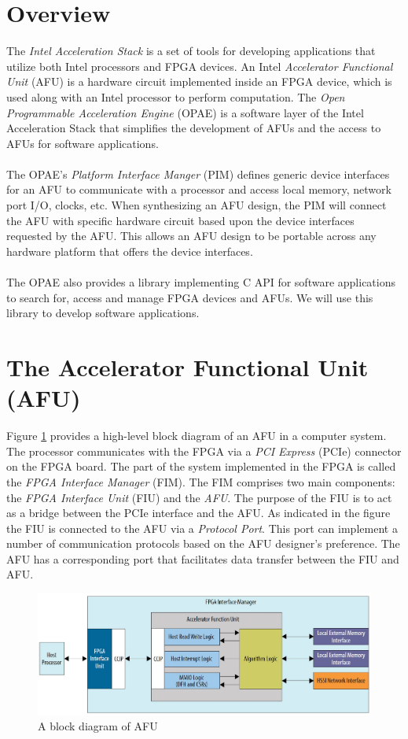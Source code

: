 \documentclass[11pt, twoside, pdftex]{article}
\begin{document}
\section{Overview}
The {\it Intel Acceleration Stack} is a set of tools for developing applications that utilize both Intel processors and FPGA devices. An Intel {\it Accelerator Functional Unit} (AFU) is a hardware circuit implemented inside an FPGA device, which is used along with an Intel processor to perform computation. The {\it Open Programmable Acceleration Engine} (OPAE) is a software layer of the Intel Acceleration Stack that simplifies the development of AFUs and the access to AFUs for software applications. \\
\\
The OPAE's {\it Platform Interface Manger} (PIM) defines generic device interfaces for an AFU to communicate with a processor and access local memory, network port I/O, clocks, etc. When synthesizing an AFU design, the PIM will connect the AFU with specific hardware circuit based upon the device interfaces requested by the AFU. This allows an AFU design to be portable across any hardware platform that offers the device interfaces.\\
\\
The OPAE also provides a library implementing C API for software applications to search for, access and manage FPGA devices and AFUs. We will use this library to develop software applications.


\section{The Accelerator Functional Unit (AFU)}
 Figure \ref{fig:AFU} provides a high-level block diagram of an AFU in a computer system. The processor communicates with the FPGA via a {\it PCI Express} (PCIe) connector on the FPGA board. The part of the system implemented in the FPGA is called the {\it FPGA Interface Manager} (FIM). The FIM comprises two main components: the {\it FPGA Interface Unit} (FIU) and the {\it AFU}. The purpose of the FIU is to act as a bridge between the PCIe interface and the AFU. As indicated in the figure the FIU is connected to the AFU via a {\it Protocol Port}. This port can implement a number of communication protocols based on the AFU designer's preference. The AFU has a corresponding port that facilitates data transfer between the FIU and AFU.\\
 
 \begin{figure}[h]
     \centering
     \includegraphics[scale=0.36]{figures/AFU.JPG}
     \caption{A block diagram of AFU}
     \label{fig:AFU}
 \end{figure}
 
\end{document}
